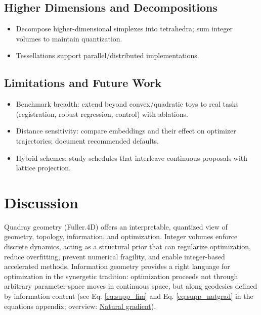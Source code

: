 \documentclass[
  10pt,
]{article}
\providecommand{\tightlist}{%
  \setlength{\itemsep}{0pt}\setlength{\parskip}{0pt}}
\begin{document}
\hypertarget{higher-dimensions-and-decompositions}{%
\subsection{Higher Dimensions and
Decompositions}\label{higher-dimensions-and-decompositions}}

\begin{itemize}
\tightlist
\item
  Decompose higher-dimensional simplexes into tetrahedra; sum integer
  volumes to maintain quantization.
\item
  Tessellations support parallel/distributed implementations.
\end{itemize}

\hypertarget{limitations-and-future-work}{%
\subsection{Limitations and Future
Work}\label{limitations-and-future-work}}

\begin{itemize}
\tightlist
\item
  Benchmark breadth: extend beyond convex/quadratic toys to real tasks
  (registration, robust regression, control) with ablations.
\item
  Distance sensitivity: compare embeddings and their effect on optimizer
  trajectories; document recommended defaults.
\item
  Hybrid schemes: study schedules that interleave continuous proposals
  with lattice projection. 
\end{itemize}

\hypertarget{discussion}{%
\section{Discussion}\label{discussion}}

Quadray geometry (Fuller.4D) offers an interpretable, quantized view of
geometry, topology, information, and optimization. Integer volumes
enforce discrete dynamics, acting as a structural prior that can
regularize optimization, reduce overfitting, prevent numerical
fragility, and enable integer-based accelerated methods. Information
geometry provides a right language for optimization in the synergetic
tradition: optimization proceeds not through arbitrary parameter-space
moves in continuous space, but along geodesics defined by information
content (see Eq. \eqref{eq:supp_fim} and Eq. \eqref{eq:supp_natgrad} in
the equations appendix; overview:
\href{https://en.wikipedia.org/wiki/Natural_gradient}{Natural
gradient}).
\end{document}
